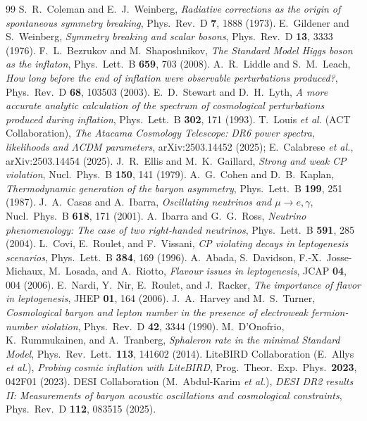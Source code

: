 \documentclass[11pt,a4paper]{article}
\begin{document}
\begin{thebibliography}{99}
 S.~R.~Coleman and E.~J.~Weinberg, \textit{Radiative corrections as the origin of spontaneous symmetry breaking}, Phys.\ Rev.\ D \textbf{7}, 1888 (1973).
 E.~Gildener and S.~Weinberg, \textit{Symmetry breaking and scalar bosons}, Phys.\ Rev.\ D \textbf{13}, 3333 (1976).
 F.~L.~Bezrukov and M.~Shaposhnikov, \textit{The Standard Model Higgs boson as the inflaton}, Phys.\ Lett.\ B \textbf{659}, 703 (2008).
 A.~R.~Liddle and S.~M.~Leach, \textit{How long before the end of inflation were observable perturbations produced?}, Phys.\ Rev.\ D \textbf{68}, 103503 (2003).
 E.~D.~Stewart and D.~H.~Lyth, \textit{A more accurate analytic calculation of the spectrum of cosmological perturbations produced during inflation}, Phys.\ Lett.\ B \textbf{302}, 171 (1993).
 T.~Louis \textit{et al.} (ACT Collaboration), \textit{The Atacama Cosmology Telescope: DR6 power spectra, likelihoods and $\Lambda$CDM parameters}, arXiv:2503.14452 (2025); E.~Calabrese \textit{et al.}, arXiv:2503.14454 (2025).
 J.~R.~Ellis and M.~K.~Gaillard, \textit{Strong and weak CP violation}, Nucl.\ Phys.\ B \textbf{150}, 141 (1979).
 A.~G.~Cohen and D.~B.~Kaplan, \textit{Thermodynamic generation of the baryon asymmetry}, Phys.\ Lett.\ B \textbf{199}, 251 (1987).
 J.~A.~Casas and A.~Ibarra, \textit{Oscillating neutrinos and $\mu \to e, \gamma$}, Nucl.\ Phys.\ B \textbf{618}, 171 (2001).
 A.~Ibarra and G.~G.~Ross, \textit{Neutrino phenomenology: The case of two right-handed neutrinos}, Phys.\ Lett.\ B \textbf{591}, 285 (2004).
 L.~Covi, E.~Roulet, and F.~Vissani, \textit{CP violating decays in leptogenesis scenarios}, Phys.\ Lett.\ B \textbf{384}, 169 (1996).
 A.~Abada, S.~Davidson, F.-X.~Josse-Michaux, M.~Losada, and A.~Riotto, \textit{Flavour issues in leptogenesis}, JCAP \textbf{04}, 004 (2006).
 E.~Nardi, Y.~Nir, E.~Roulet, and J.~Racker, \textit{The importance of flavor in leptogenesis}, JHEP \textbf{01}, 164 (2006).
 J.~A.~Harvey and M.~S.~Turner, \textit{Cosmological baryon and lepton number in the presence of electroweak fermion-number violation}, Phys.\ Rev.\ D \textbf{42}, 3344 (1990).
 M.~D'Onofrio, K.~Rummukainen, and A.~Tranberg, \textit{Sphaleron rate in the minimal Standard Model}, Phys.\ Rev.\ Lett.\ \textbf{113}, 141602 (2014).
 LiteBIRD Collaboration (E.~Allys \textit{et al.}), \textit{Probing cosmic inflation with LiteBIRD}, Prog.\ Theor.\ Exp.\ Phys.\ \textbf{2023}, 042F01 (2023).
 DESI Collaboration (M.~Abdul-Karim \textit{et al.}), \textit{DESI DR2 results II: Measurements of baryon acoustic oscillations and cosmological constraints}, Phys.\ Rev.\ D \textbf{112}, 083515 (2025).
\end{thebibliography}
\endgroup
\end{document}
